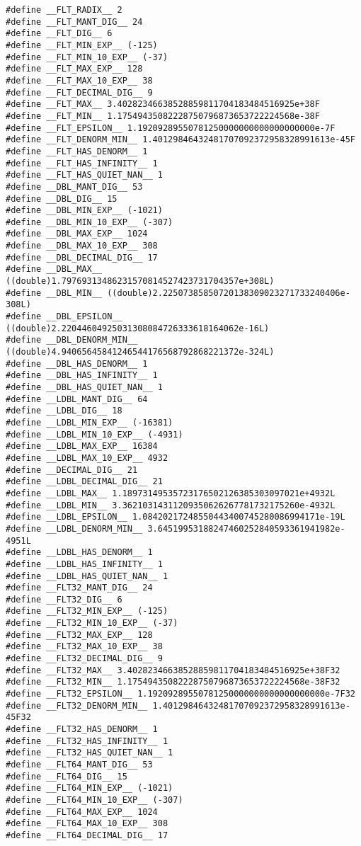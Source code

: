 \documentclass[11pt]{article}
\begin{document}
\begin{enumerate}
\begin{verbatim}
#define __FLT_RADIX__ 2
#define __FLT_MANT_DIG__ 24
#define __FLT_DIG__ 6
#define __FLT_MIN_EXP__ (-125)
#define __FLT_MIN_10_EXP__ (-37)
#define __FLT_MAX_EXP__ 128
#define __FLT_MAX_10_EXP__ 38
#define __FLT_DECIMAL_DIG__ 9
#define __FLT_MAX__ 3.40282346638528859811704183484516925e+38F
#define __FLT_MIN__ 1.17549435082228750796873653722224568e-38F
#define __FLT_EPSILON__ 1.19209289550781250000000000000000000e-7F
#define __FLT_DENORM_MIN__ 1.40129846432481707092372958328991613e-45F
#define __FLT_HAS_DENORM__ 1
#define __FLT_HAS_INFINITY__ 1
#define __FLT_HAS_QUIET_NAN__ 1
#define __DBL_MANT_DIG__ 53
#define __DBL_DIG__ 15
#define __DBL_MIN_EXP__ (-1021)
#define __DBL_MIN_10_EXP__ (-307)
#define __DBL_MAX_EXP__ 1024
#define __DBL_MAX_10_EXP__ 308
#define __DBL_DECIMAL_DIG__ 17
#define __DBL_MAX__ ((double)1.79769313486231570814527423731704357e+308L)
#define __DBL_MIN__ ((double)2.22507385850720138309023271733240406e-308L)
#define __DBL_EPSILON__ ((double)2.22044604925031308084726333618164062e-16L)
#define __DBL_DENORM_MIN__ ((double)4.94065645841246544176568792868221372e-324L)
#define __DBL_HAS_DENORM__ 1
#define __DBL_HAS_INFINITY__ 1
#define __DBL_HAS_QUIET_NAN__ 1
#define __LDBL_MANT_DIG__ 64
#define __LDBL_DIG__ 18
#define __LDBL_MIN_EXP__ (-16381)
#define __LDBL_MIN_10_EXP__ (-4931)
#define __LDBL_MAX_EXP__ 16384
#define __LDBL_MAX_10_EXP__ 4932
#define __DECIMAL_DIG__ 21
#define __LDBL_DECIMAL_DIG__ 21
#define __LDBL_MAX__ 1.18973149535723176502126385303097021e+4932L
#define __LDBL_MIN__ 3.36210314311209350626267781732175260e-4932L
#define __LDBL_EPSILON__ 1.08420217248550443400745280086994171e-19L
#define __LDBL_DENORM_MIN__ 3.64519953188247460252840593361941982e-4951L
#define __LDBL_HAS_DENORM__ 1
#define __LDBL_HAS_INFINITY__ 1
#define __LDBL_HAS_QUIET_NAN__ 1
#define __FLT32_MANT_DIG__ 24
#define __FLT32_DIG__ 6
#define __FLT32_MIN_EXP__ (-125)
#define __FLT32_MIN_10_EXP__ (-37)
#define __FLT32_MAX_EXP__ 128
#define __FLT32_MAX_10_EXP__ 38
#define __FLT32_DECIMAL_DIG__ 9
#define __FLT32_MAX__ 3.40282346638528859811704183484516925e+38F32
#define __FLT32_MIN__ 1.17549435082228750796873653722224568e-38F32
#define __FLT32_EPSILON__ 1.19209289550781250000000000000000000e-7F32
#define __FLT32_DENORM_MIN__ 1.40129846432481707092372958328991613e-45F32
#define __FLT32_HAS_DENORM__ 1
#define __FLT32_HAS_INFINITY__ 1
#define __FLT32_HAS_QUIET_NAN__ 1
#define __FLT64_MANT_DIG__ 53
#define __FLT64_DIG__ 15
#define __FLT64_MIN_EXP__ (-1021)
#define __FLT64_MIN_10_EXP__ (-307)
#define __FLT64_MAX_EXP__ 1024
#define __FLT64_MAX_10_EXP__ 308
#define __FLT64_DECIMAL_DIG__ 17

\end{verbatim}
\end{enumerate}
\end{document}
